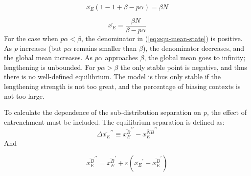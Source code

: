 \begin{equation}
\overline{x_{E}}(1-1+\beta-p\alpha)=\beta N
\end{equation}

\begin{equation}
\overline{x_{E}}=\frac{\beta N}{\beta-p\alpha}\label{eq:equ-mean-state}
\end{equation}
For the case when $p\alpha<\beta$, the denominator in (\ref{eq:equ-mean-state})
is positive. As \emph{p} increases (but $p\alpha$ remains smaller
than $\beta$), the denominator decreases, and the global mean increases.
As $p\alpha$ approaches $\beta$, the global mean goes to infinity;
lengthening is unbounded. For $p\alpha>\beta$ the only stable point
is negative, and thus there is no well-defined equilibrium. The 
model is thus only stable if the lengthening strength is not too great,
and the percentage of biasing contexts is not too large. 

To calculate the dependence of the sub-distribution separation on
\emph{p,} the effect of entrenchment must be included. The equilibrium
separation is defined as: 
\begin{equation}
\varDelta\overline{x_{E}}^{\prime\prime}\equiv\overline{x_{E}^{B}}^{\prime\prime}-\overline{x_{E}^{NB}}^{\prime\prime}
\end{equation}
And 

\begin{equation}
\overline{x_{E}^{B}}^{\prime\prime}=\overline{x_{E}^{B}}^{\prime}+\varepsilon\left(\overline{x_{E}}^{\prime}-\overline{x_{E}^{B}}^{\prime}\right)
\end{equation}

